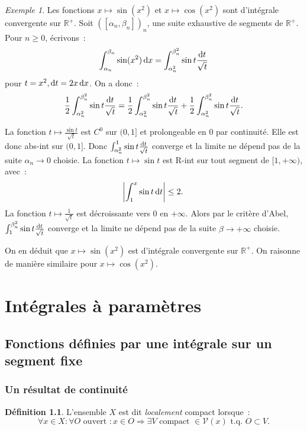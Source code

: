 \documentclass{report}
\theoremstyle{definition}
\newtheorem{déf}[thm]{Définition}
\theoremstyle{remark}
\newtheorem{ex}{Exemple}[chapter]
\numberwithin{equation}{section}
\newcommand{\R}{\mathbb R}
\newcommand{\Rp}{\R^{+}}
\newcommand{\tq}{\text{ t.q. }}
\newcommand{\pinfty}{{+\infty}}
\begin{document}
			\begin{ex}Les fonctions $x \mapsto \sin(x^2)$ et $x \mapsto \cos(x^2)$ sont d'intégrale convergente sur $\Rp$. Soit $([\alpha_n, \beta_n])_n$, une suite
			exhaustive de segments de $\Rp$. Pour $n \geq 0$, écrivons~:
			\begin{equation}
				\int_{\alpha_n}^{\beta_n}\sin(x^2)\dif x = \int_{\alpha_n^2}^{\beta_n^2}\sin t\frac {\dif t}{\sqrt t}
			\end{equation}
			pour $t = x^2, \dif t = 2x\dif x$. On a donc~:
			\begin{equation}
				\frac 12\int_{\alpha_n^2}^{\beta_n^2}\sin t\frac {\dif t}{\sqrt t}
				= \frac 12\int_{\alpha_n^2}^{\beta_n^2}\sin t \frac {\dif t}{\sqrt t} + \frac 12\int_{\alpha_n^2}^{\beta_n^2}\sin t\frac {\dif t}{\sqrt t}.
			\end{equation}

			La fonction $t \mapsto \frac {\sin t}{\sqrt t}$ est $C^0$ sur $(0, 1]$ et prolongeable en $0$ par continuité. Elle est donc abs-int sur $(0, 1]$. Donc
			$\int_{\alpha_n^2}^1\sin t \frac {\dif t}{\sqrt t}$ converge et la limite ne dépend pas de la suite $\alpha_n \to 0$ choisie.
			La fonction $t \mapsto \sin t$ est R-int sur tout segment de $[1, \pinfty)$, avec~:
			\begin{equation}
				\abs {\int_1^x\sin t\dif t} \leq 2.
			\end{equation}
			La fonction $t \mapsto \frac 1{\sqrt t}$ est décroissante vers $0$ en $\pinfty$. Alors par le critère d'Abel,
			$\int_1^{\beta_n^2}\sin t\frac {\dif t}{\sqrt t}$ converge et la limite ne dépend pas de la suite $\beta \to \pinfty$ choisie.

			On en déduit que $x \mapsto \sin(x^2)$ est d'intégrale convergente sur $\Rp$. On raisonne de manière similaire pour $x \mapsto \cos(x^2)$.
			\end{ex}

\chapter{Intégrales à paramètres}
	\section{Fonctions définies par une intégrale sur un segment fixe}
		\subsection{Un résultat de continuité}
			\begin{déf} L'ensemble $X$ est dit \textit{localement} compact lorsque~:
			\begin{equation}
				\forall x \in X : \forall O \text{ ouvert } : x \in O \Rightarrow \exists V \text{ compact } \in \mathcal V(x) \tq O \subset V.
			\end{equation}
			\end{déf}
\end{document}
